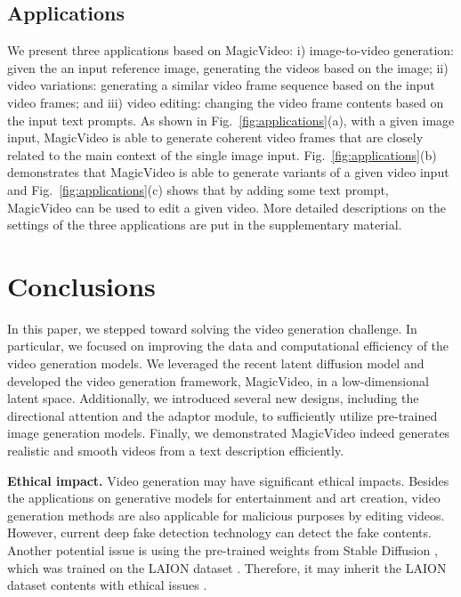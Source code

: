 \documentclass[10pt,twocolumn,letterpaper]{article}
\newcommand{\myPara}[1]{\vspace{6pt}\noindent\textbf{#1}}
\begin{document}
\subsection{Applications}
We   present three applications based on MagicVideo: i) image-to-video generation: given the an input reference image, generating the videos based on the image;  ii) video variations: generating a  similar video frame sequence based on the input video frames;  and iii) video editing: changing the video frame contents based on the input text prompts. As shown in Fig.~\ref{fig:applications}(a), with a given image input, MagicVideo is able to generate coherent video frames that are closely related to the main context of the single image input. Fig.~\ref{fig:applications}(b) demonstrates that MagicVideo is able to generate variants of a given video input and Fig.~\ref{fig:applications}(c) shows that by adding some text prompt, MagicVideo can be used to edit a given video. More detailed descriptions on the settings of the three applications are put in the supplementary material.

 

\section{Conclusions}
In this paper, we stepped toward solving the video generation challenge. In particular, we focused on improving the data and computational efficiency of the video generation models. We leveraged the recent latent diffusion model and developed the video generation framework, MagicVideo, in a low-dimensional latent space. Additionally, we introduced several new designs, including the directional attention and the adaptor module, to sufficiently utilize pre-trained image generation models. Finally, we demonstrated MagicVideo indeed generates realistic and smooth videos from a text  description efficiently. 

\myPara{Ethical impact.} Video generation may have significant ethical impacts. Besides the applications on   generative models  for entertainment and art creation, video generation methods are also applicable for malicious purposes by editing videos. However, current deep fake detection technology can detect the fake contents. Another potential issue is using the pre-trained weights from Stable Diffusion \cite{rombach2022high},
which was trained on the LAION dataset \cite{laion5b}. Therefore, it may inherit the LAION dataset   contents with ethical issues  \cite{birhane2021multimodal}.



{

}
\end{document}
